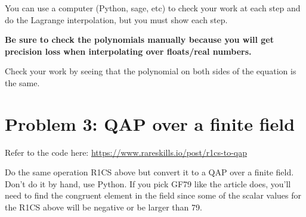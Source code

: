 \documentclass{article}
\begin{document}
You can use a computer (Python, sage, etc) to check your work at each step and do the Lagrange interpolation, but you must show each step.

\textbf{Be sure to check the polynomials manually because you will get precision loss when interpolating over floats/real numbers.}

Check your work by seeing that the polynomial on both sides of the equation is the same.

\section{Problem 3: QAP over a finite field}

Refer to the code here: \url{https://www.rareskills.io/post/r1cs-to-qap}

Do the same operation R1CS above but convert it to a QAP over a finite field. Don't do it by hand, use Python. If you pick GF79 like the article does, you'll need to find the congruent element in the field since some of the scalar values for the R1CS above will be negative or be larger than 79.
\end{document}
